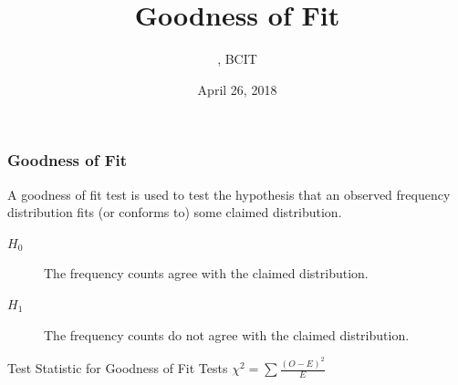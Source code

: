 \documentclass[xcolor=dvipsnames]{beamer}
\title{Goodness of Fit}
\subtitle{{\CourseNumber}, BCIT}
\author{\CourseName}
\date{April 26, 2018}
\begin{document}
\begin{frame}
  \titlepage
\end{frame}

\begin{frame}
  \frametitle{Goodness of Fit}
  A \alert{goodness of fit} test is used to test the hypothesis
  that an observed frequency distribution fits (or conforms to)
  some claimed distribution.

  \begin{description}
  \item[$H_{0}$] The frequency counts agree with the claimed
    distribution.
  \item[$H_{1}$]  The frequency counts do not agree with the claimed
    distribution.
  \end{description}

  \bigskip

  \begin{block}{Test Statistic for Goodness of Fit Tests}
    $\displaystyle \chi^{2}=\sum\frac{(O-E)^{2}}{E}$
  \end{block}
\end{frame}
\end{document}
